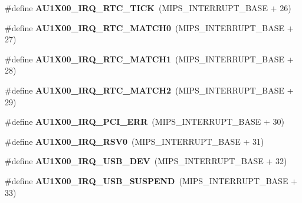\begin{DoxyCompactItemize}
\#define {\bfseries A\+U1\+X00\+\_\+\+I\+R\+Q\+\_\+\+R\+T\+C\+\_\+\+T\+I\+CK}~(M\+I\+P\+S\+\_\+\+I\+N\+T\+E\+R\+R\+U\+P\+T\+\_\+\+B\+A\+SE + 26)
\item 
\mbox{\label{group__bsp__interrupt_ga4045e09da9b962aafc54217dd1fef577}} 
\#define {\bfseries A\+U1\+X00\+\_\+\+I\+R\+Q\+\_\+\+R\+T\+C\+\_\+\+M\+A\+T\+C\+H0}~(M\+I\+P\+S\+\_\+\+I\+N\+T\+E\+R\+R\+U\+P\+T\+\_\+\+B\+A\+SE + 27)
\item 
\mbox{\label{group__bsp__interrupt_ga8c4531f49bb6e1065781cee3784c84cd}} 
\#define {\bfseries A\+U1\+X00\+\_\+\+I\+R\+Q\+\_\+\+R\+T\+C\+\_\+\+M\+A\+T\+C\+H1}~(M\+I\+P\+S\+\_\+\+I\+N\+T\+E\+R\+R\+U\+P\+T\+\_\+\+B\+A\+SE + 28)
\item 
\mbox{\label{group__bsp__interrupt_ga65005512e2dbfdb9cbe5c266f5ea099d}} 
\#define {\bfseries A\+U1\+X00\+\_\+\+I\+R\+Q\+\_\+\+R\+T\+C\+\_\+\+M\+A\+T\+C\+H2}~(M\+I\+P\+S\+\_\+\+I\+N\+T\+E\+R\+R\+U\+P\+T\+\_\+\+B\+A\+SE + 29)
\item 
\mbox{\label{group__bsp__interrupt_gaca508da48208b426eb1379e78050a1c6}} 
\#define {\bfseries A\+U1\+X00\+\_\+\+I\+R\+Q\+\_\+\+P\+C\+I\+\_\+\+E\+RR}~(M\+I\+P\+S\+\_\+\+I\+N\+T\+E\+R\+R\+U\+P\+T\+\_\+\+B\+A\+SE + 30)
\item 
\mbox{\label{group__bsp__interrupt_ga57df41ac5acd58af65a6ae39c8ac8099}} 
\#define {\bfseries A\+U1\+X00\+\_\+\+I\+R\+Q\+\_\+\+R\+S\+V0}~(M\+I\+P\+S\+\_\+\+I\+N\+T\+E\+R\+R\+U\+P\+T\+\_\+\+B\+A\+SE + 31)
\item 
\mbox{\label{group__bsp__interrupt_ga810dd6a434a2ea2567ccf7e2e634a625}} 
\#define {\bfseries A\+U1\+X00\+\_\+\+I\+R\+Q\+\_\+\+U\+S\+B\+\_\+\+D\+EV}~(M\+I\+P\+S\+\_\+\+I\+N\+T\+E\+R\+R\+U\+P\+T\+\_\+\+B\+A\+SE + 32)
\item 
\mbox{\label{group__bsp__interrupt_ga8221d2d975394a9c6b7417f9eddb1ce6}} 
\#define {\bfseries A\+U1\+X00\+\_\+\+I\+R\+Q\+\_\+\+U\+S\+B\+\_\+\+S\+U\+S\+P\+E\+ND}~(M\+I\+P\+S\+\_\+\+I\+N\+T\+E\+R\+R\+U\+P\+T\+\_\+\+B\+A\+SE + 33)
\item 
\mbox{\label{group__bsp__interrupt_ga8fef64cc23a23bb5f1a36a3de25ef635}} 

\end{DoxyCompactItemize}
